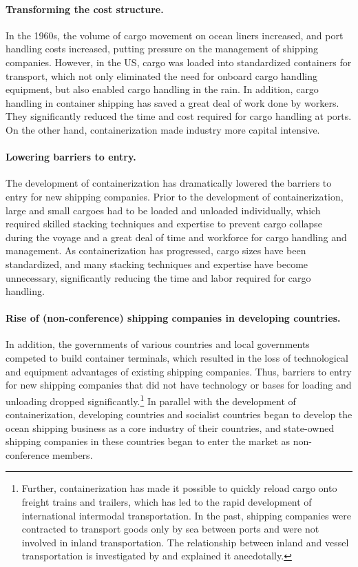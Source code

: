 \documentclass[11pt]{article}
\begin{document}
\paragraph{Transforming the cost structure.}
In the 1960s, the volume of cargo movement on ocean liners increased, and port handling costs increased, putting pressure on the management of shipping companies. However, in the US, cargo was loaded into standardized containers for transport, which not only eliminated the need for onboard cargo handling equipment, but also enabled cargo handling in the rain. In addition, cargo handling in container shipping has saved a great deal of work done by workers. They significantly reduced the time and cost required for cargo handling at ports. On the other hand, containerization made industry more capital intensive.

\paragraph{Lowering barriers to entry.}
The development of containerization has dramatically lowered the barriers to entry for new shipping companies. Prior to the development of containerization, large and small cargoes had to be loaded and unloaded individually, which required skilled stacking techniques and expertise to prevent cargo collapse during the voyage and a great deal of time and workforce for cargo handling and management. As containerization has progressed, cargo sizes have been standardized, and many stacking techniques and expertise have become unnecessary, significantly reducing the time and labor required for cargo handling.

\paragraph{Rise of (non-conference) shipping companies in developing countries.}
In addition, the governments of various countries and local governments competed to build container terminals, which resulted in the loss of technological and equipment advantages of existing shipping companies. Thus, barriers to entry for new shipping companies that did not have technology or bases for loading and unloading dropped significantly.\footnote{Further, containerization has made it possible to quickly reload cargo onto freight trains and trailers, which has led to the rapid development of international intermodal transportation. In the past, shipping companies were contracted to transport goods only by sea between ports and were not involved in inland transportation. The relationship between inland and vessel transportation is investigated by \cite{bernhofen2016estimating} and \cite{levinson2016box} explained it anecdotally. } In parallel with the development of containerization, developing countries and socialist countries began to develop the ocean shipping business as a core industry of their countries, and state-owned shipping companies in these countries began to enter the market as non-conference members.
\end{document}
